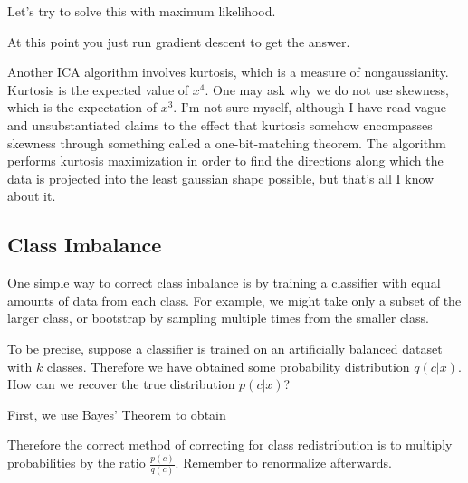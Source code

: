 \documentclass[12pt]{article}
\begin{document}
Let's try to solve this with maximum likelihood.


At this point you just run gradient descent to get the answer. 

Another ICA algorithm involves kurtosis, which is a measure of nongaussianity. Kurtosis is the expected value of $x^4$. One may ask why we do not use skewness, which is the expectation of $x^3$. I'm not sure myself, although I have read vague and unsubstantiated claims to the effect that kurtosis somehow encompasses skewness through something called a one-bit-matching theorem.
The algorithm performs kurtosis maximization in order to find the directions along which the data is projected into the least gaussian shape possible, but that's all I know about it.

\subsection{Class Imbalance}

One simple way to correct class inbalance is by training a classifier with equal amounts of data from each class. For example, we might take only a subset of the larger class, or bootstrap by sampling multiple times from the smaller class.

To be precise, suppose a classifier is trained on an artificially balanced dataset with $k$ classes. Therefore we have obtained some probability distribution $q(c|x)$. How can we recover the true distribution $p(c|x)$?

First, we use Bayes' Theorem to obtain

Therefore the correct method of correcting for class redistribution is to multiply probabilities by the ratio $\frac{p(c)}{q(c)}$. Remember to renormalize afterwards.
\end{document}
